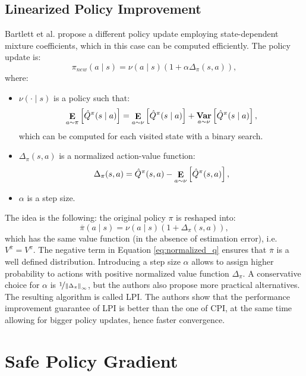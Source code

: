 \subsection{Linearized Policy Improvement}
Bartlett et al. \cite{abbasi2016fast} propose a different policy update employing state-dependent mixture coefficients, which in this case can be computed efficiently.
The policy update is:
\[
	\pi_{new}(a \mid s) = \nu(a \mid s)(1+\alpha\Delta_{\pi}(s,a)),
\]
where:
\begin{itemize}
\item $\nu(\cdot \mid s)$ is a policy such that:
\begin{equation}\label{eq:same_value}
\expected{a}{\pi}{\hat{Q}^{\pi}(s \mid a)} = \expected{a}{\nu}{\hat{Q}^{\pi}(s \mid a)} + 
	\mathop{\mathbf{Var}}\limits_{a \sim \nu}\left[\hat{Q}^{\pi}(s \mid a)\right],
\end{equation}
which can be computed for each visited state with a binary search.
\item $\Delta_\pi(s,a)$ is a normalized action-value function:
\begin{equation}\label{eq:normalized_q}
	\Delta_\pi(s,a) = \hat{Q}^\pi(s,a) - \expected{a}{\nu}{\hat{Q}^\pi(s,a)},
\end{equation}
\item $\alpha$ is a step size.
\end{itemize}
The idea is the following: the original policy $\pi$ is reshaped into:
\[
	\overline{\pi}(a \mid s) = \nu(a \mid s)(1+\Delta_{\pi}(s,a)),
\]
which has the same value function (in the absence of estimation error), i.e.\ $V^{\overline{\pi}} = V^\pi$. The negative term in Equation \ref{eq:normalized_q} ensures that $\overline{\pi}$ is a well defined distribution. Introducing a step size $\alpha$ allows to assign higher probability to actions with positive normalized value function $\Delta_\pi$. A conservative choice for $\alpha$ is $\nicefrac{1}{\norm[\infty]{\Delta_\pi}}$, but the authors also propose more practical alternatives.
The resulting algorithm is called \ac{LPI}. The authors show that the performance improvement guarantee of \ac{LPI} is better than the one of \ac{CPI}, at the same time allowing for bigger policy updates, hence faster convergence.

\section{Safe Policy Gradient}\label{sec:spg}
